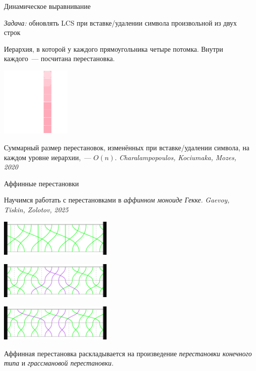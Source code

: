 \documentclass[svgnames]{beamer}
\newcommand{\flink}[1]{{\footnotesize\it\color{SkyBlue!40!White} #1}}
\begin{document}
\begin{frame}{Динамическое выравнивание}
\vspace{-7mm}

\begin{block}{\vspace*{-3ex}}
{\it Задача:} обновлять LCS при вставке/удалении символа произвольной из двух строк
\end{block}

Иерархия, в которой у каждого прямоугольника четыре потомка.
Внутри каждого~— посчитана перестановка.

\begin{center}
  \includegraphics[width=3.4cm]{svg/dynamic}
\end{center}

Суммарный размер перестановок, изменённых при вставке/удалении символа, на каждом уровне иерархии,~— \(O(n)\).
\hfill \flink{Charalampopoulos, Kociumaka, Mozes, 2020}

\end{frame}


\begin{frame}{Аффинные перестановки}
\vspace{-3mm}

Научимся работать с перестановками в {\it аффинном моноиде Гекке.}
\hfill \flink{Gaevoy, Tiskin, Zolotov, 2025}

\begin{center}
  \includegraphics[width=5.5cm]{img-fg/tP}
  
  \includegraphics[width=5.5cm]{img-fg/tP-FG}

  \includegraphics[width=5.5cm]{img-fg/tP-GF}
\end{center}

Аффинная перестановка раскладывается на произведение {\it перестановки конечного типа} и {\it грассмановой перестановки.} \vspace{2mm}

\end{frame}
\end{document}
